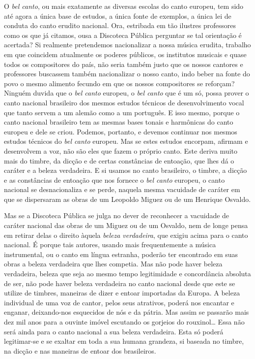 O \textit{bel canto}, ou mais exatamente as diversas escolas do canto europeu,
tem sido até agora a única base de estudos, a única fonte de exemplos, a
única lei de conduta do canto erudito nacional. Ora, estribada em tão
ilustres professores como os que já citamos, ousa a Discoteca Pública
perguntar se tal orientação é acertada? Si realmente pretendemos
nacionalizar a nossa música erudita, trabalho em que coincidem
atualmente os poderes públicos, os institutos musicais e quase todos os
compositores do país, não seria também justo que os nossos cantores e
professores buscassem também nacionalizar o nosso canto, indo beber na
fonte do povo o mesmo alimento fecundo em que os nossos compositores se
reforçam? Ninguém duvida que o \textit{\textit{bel canto}} europeu, o \textit{\textit{bel canto}} que é um
só, possa prover o canto nacional brasileiro dos mesmos estudos técnicos
de desenvolvimento vocal que tanto servem a um alemão como a um
português. E isso mesmo, porque o canto nacional brasileiro tem as
mesmas bases tonais e harmônicas do canto europeu e dele se criou.
Podemos, portanto, e devemos continuar nos mesmos estudos técnicos do
\textit{bel canto} europeu. Mas se estes estudos encorpam, afirmam e desenvolvem
a voz, não são eles que fazem o próprio canto. Este deriva muito mais do
timbre, da dicção e de certas constâncias de entoação, que lhes dá o
caráter e a beleza verdadeira. E si usamos no canto brasileiro, o
timbre, a dicção e as constâncias de entoação que nos fornece o \textit{bel
canto} europeu, o canto nacional se desnacionaliza e se perde, naquela
mesma vacuidade de caráter em que se dispersaram as obras de um Leopoldo
Miguez ou de um Henrique Osvaldo.

Mas se a Discoteca Pública se julga no dever de reconhecer a vacuidade
de caráter nacional das obras de um Miguez ou de um Osvaldo, nem de
longe pensa em retirar delas o direito àquela \textit{beleza verdadeira}, que
exigiu acima para o canto nacional. É porque tais autores, usando mais
frequentemente a música instrumental, ou o canto em língua estranha,
poderão ter encontrado em suas obras a beleza verdadeira que lhes
competia. Mas não pode haver beleza verdadeira, beleza que seja ao mesmo
tempo legitimidade e concordância absoluta de ser, não pode haver beleza
verdadeira no canto nacional desde que este se utilize de timbres,
maneiras de dizer e entoar importadas da Europa. A beleza individual de
uma voz de cantor, pelos seus atrativos, poderá nos encantar e enganar,
deixando-nos esquecidos de nós e da pátria. Mas assim se passarão mais
dez mil anos para a ouvinte imóvel escutando os gorjeios do rouxinol\ldots{}
Essa não será ainda para o canto nacional a sua beleza verdadeira. Esta
só poderá legitimar-se e se exaltar em toda a sua humana grandeza, si
baseada no timbre, na dicção e nas maneiras de entoar dos brasileiros.

